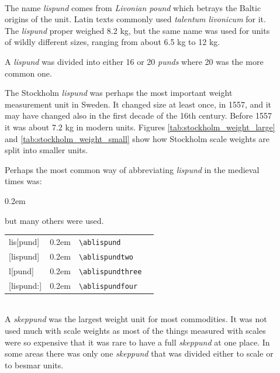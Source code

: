 \documentclass[a4paper]{article}
\newcommand{\samplefont}{\fontsize{16}{16}\abcursivefamily\spaceskip0.2em}
\newcommand{\sample}[1]{{\samplefont #1 \strut}}
\newcommand{\ltxncmd}[1]{\texttt{\textbackslash{}#1}}
\begin{document}
\begin{description}
\item [\sample{\ablispund}, \sample{\ablispundtwo},
  \sample{\ablispundthree}, \sample{\ablispundfour}\emph{Lispund},
  \emph{leiviskä}, \emph{talentum livonicum}] \mbox{} \\
  The name \emph{lispund} comes from \emph{Livonian pound} which
  betrays the Baltic origins of the unit. Latin texts commonly used
  \emph{talentum livonicum} for it. The \emph{lispund} proper weighed
  8.2 kg, but the same name was used for units of wildly different
  sizes, ranging from about 6.5 kg to 12 kg. 

  A \emph{lispund} was divided into either 16 or 20 \emph{punds} where
  20 was the more common one. 

  The Stockholm \emph{lispund} was perhaps the most important weight
  measurement unit in Sweden. It changed size at least once, in 1557,
  and it may have changed also in the first decade of the 16th
  century. Before 1557 it was about 7.2 kg in modern units. Figures
  \ref{tab:stockholm_weight_large} and
  \ref{tab:stockholm_weight_small} show how Stockholm scale weights
  are split into smaller units.
    
  Perhaps the most common way of abbreviating \emph{lispund} in the
  medieval times was: \sample{\ablispund} but many others were used. 
  \begin{center}
    \begin{tabular}{llll}
      {}lis[pund]  & \sample{\ablispund} & \ltxncmd{ablispund} \\
      {}[lispund]  & \sample{\ablispundtwo} & \ltxncmd{ablispundtwo} \\
      {}l[pund]  & \sample{\ablispundthree} & \ltxncmd{ablispundthree} \\
      {}[lispund:]  & \sample{\ablispundfour} & \ltxncmd{ablispundfour} \\
    \end{tabular}
  \end{center}

\item [\sample{\abskeppund}, \sample{\abskeppundtwo}, \emph{Skeppund},
  \emph{kippunta}] \mbox{}\\
  A \emph{skeppund} was the largest weight unit for most commodities.
  It was not used much with scale weights as most of the things
  measured with scales were so expensive that it was rare to have a
  full \emph{skeppund} at one place. In some areas there was only one
  \emph{skeppund} that was divided either to scale or to besmar units.


\end{description}
\end{document}
